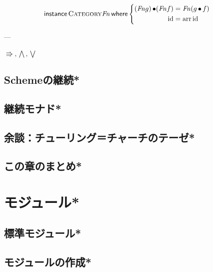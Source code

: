 \documentclass[a5paper,twoside,fleqn,draft]{jsbook}
\newcommand{\programminglanguage}[1]{\textsf{#1}}
\newcommand{\scheme}{\programminglanguage{Scheme}}
\newcommand{\mKeyword}[1]{\mathsf{#1}} %
\newcommand{\mInstanceKeyword}{\mKeyword{instance}}
\newcommand{\mWhereKeyword}{\mKeyword{where}}
\DeclareMathOperator{\mInstance}{\mInstanceKeyword}
\DeclareMathOperator{\mWhere}{\mWhereKeyword}
\DeclareMathOperator{\mId}{id}
\DeclareMathOperator{\mArrow}{\Rrightarrow}
\DeclareMathOperator{\mArrowAnd}{\bigwedge}%
\DeclareMathOperator{\mArrowOr}{\bigvee}%
\DeclareMathOperator{\mComp}{\bullet} %
\newcommand{\mGenericTypeClass}[1]{\textsc{#1}} %
\begin{document}
\begin{equation}
  \mInstance\mGenericTypeClass{Category}\mathit{Fn}\mWhere
  \left\{
  \begin{aligned}
    (\mathit{Fn} g)\mComp(\mathit{Fn} f)&=\mathit{Fn}(g\mComp f)\\
    \mId&=\mathop{\mathrm{arr}}\mId
  \end{aligned}
  \right.
\end{equation}

---

$\mArrow,\mArrowAnd,\mArrowOr$


\section{\scheme の継続*}
\section{継続モナド*}
\section{余談：チューリング＝チャーチのテーゼ*}
\section{この章のまとめ*}

\chapter{モジュール*}
\section{標準モジュール*}
\section{モジュールの作成*}
\end{document}

